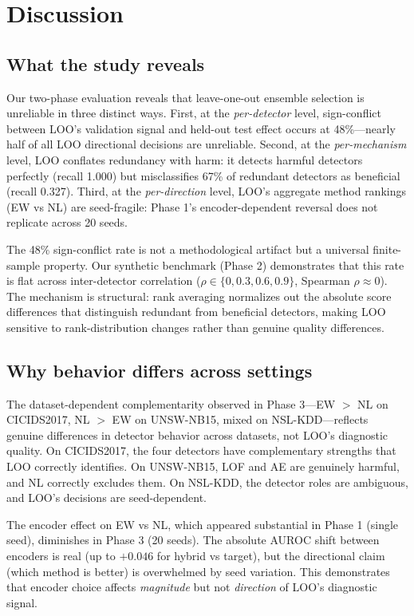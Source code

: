\section{Discussion}
\label{sec:discussion}

\subsection{What the study reveals}

Our two-phase evaluation reveals that leave-one-out ensemble selection is unreliable in three distinct ways. First, at the \emph{per-detector} level, sign-conflict between LOO's validation signal and held-out test effect occurs at 48\%---nearly half of all LOO directional decisions are unreliable. Second, at the \emph{per-mechanism} level, LOO conflates redundancy with harm: it detects harmful detectors perfectly (recall 1.000) but misclassifies 67\% of redundant detectors as beneficial (recall 0.327). Third, at the \emph{per-direction} level, LOO's aggregate method rankings (EW vs NL) are seed-fragile: Phase 1's encoder-dependent reversal does not replicate across 20 seeds.

The 48\% sign-conflict rate is not a methodological artifact but a universal finite-sample property. Our synthetic benchmark (Phase 2) demonstrates that this rate is flat across inter-detector correlation ($\rho \in \{0, 0.3, 0.6, 0.9\}$, Spearman $\rho \approx 0$). The mechanism is structural: rank averaging normalizes out the absolute score differences that distinguish redundant from beneficial detectors, making LOO sensitive to rank-distribution changes rather than genuine quality differences.

\subsection{Why behavior differs across settings}

The dataset-dependent complementarity observed in Phase 3---EW $>$ NL on CICIDS2017, NL $>$ EW on UNSW-NB15, mixed on NSL-KDD---reflects genuine differences in detector behavior across datasets, not LOO's diagnostic quality. On CICIDS2017, the four detectors have complementary strengths that LOO correctly identifies. On UNSW-NB15, LOF and AE are genuinely harmful, and NL correctly excludes them. On NSL-KDD, the detector roles are ambiguous, and LOO's decisions are seed-dependent.

The encoder effect on EW vs NL, which appeared substantial in Phase 1 (single seed), diminishes in Phase 3 (20 seeds). The absolute AUROC shift between encoders is real (up to $+0.046$ for hybrid vs target), but the directional claim (which method is better) is overwhelmed by seed variation. This demonstrates that encoder choice affects \emph{magnitude} but not \emph{direction} of LOO's diagnostic signal.

